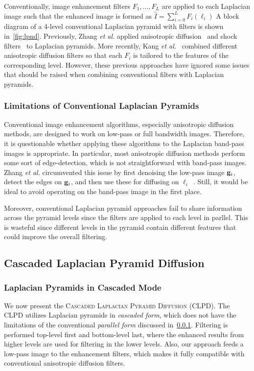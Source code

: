 Conventionally, image enhancement filters \(F_1, \ldots, F_L\) are applied to each Laplacian image such that the enhanced image is formed as \(\widehat{I} = \sum_{i=0}^L F_i\left({\boldsymbol\ell}_{i}\right) \)
A block diagram of a 4-level conventional Laplacian pyramid with filters is shown in~\cref{fig:lpnd}.
Previously, Zhang \textit{et al.} applied anisotropic diffusion~\cite{perona_scalespace_1990} and shock filters~\cite{zhang_multiscale_2006} to Laplacian pyramids.
More recently, Kang \textit{et al.}~\cite{kang_new_2016} combined different anisotropic diffusion filters so that each \(F_i\) is tailored to the features of the corresponding level.
However, these previous approaches have ignored some issues that should be raised when combining conventional filters with Laplacian pyramids.

\subsubsection{Limitations of Conventional Laplacian Pyramids}\label{section:limitations}
Conventional image enhancement algorithms, especially anisotropic diffusion methods, are designed to work on low-pass or full bandwidth images.
Therefore, it is questionable whether applying these algorithms to the Laplacian band-pass images is appropriate.
In particular, most anisotropic diffusion methods perform some sort of edge-detection, which is not straightforward with band-pass images.
Zhang \textit{et al.} circumvented this issue by first denoising the low-pass image \(\mathbf{g}_{i}\), detect the edges on \(\mathbf{g}_{i}\), and then use these for diffusing on \({\boldsymbol\ell}_{i}\)~\cite{zhang_multiscale_2006}.
Still, it would be ideal to avoid operating on the band-pass image in the first place.

Moreover, conventional Laplacian pyramid approaches fail to share information across the pyramid levels since the filters are applied to each level in parllel.
This is wasteful since different levels in the pyramid contain different features that could improve the overall filtering.

\subsection{Cascaded Laplacian Pyramid Diffusion}
\subsubsection{Laplacian Pyramids in Cascaded Mode}
We now present the \textsc{Cascaded Laplacian Pyramid Diffusion} (CLPD).
The CLPD utilizes Laplacian pyramids in \textit{cascaded form}, which does not have the limitations of the conventional \textit{parallel form} discussed in~\cref{section:limitations}.
Filtering is performed top-level first and bottom-level last, where the enhanced results from higher levels are used for filtering in the lower levels.
Also, our approach feeds a low-pass image to the enhancement filters, which makes it fully compatible with conventional anisotropic diffusion filters.

